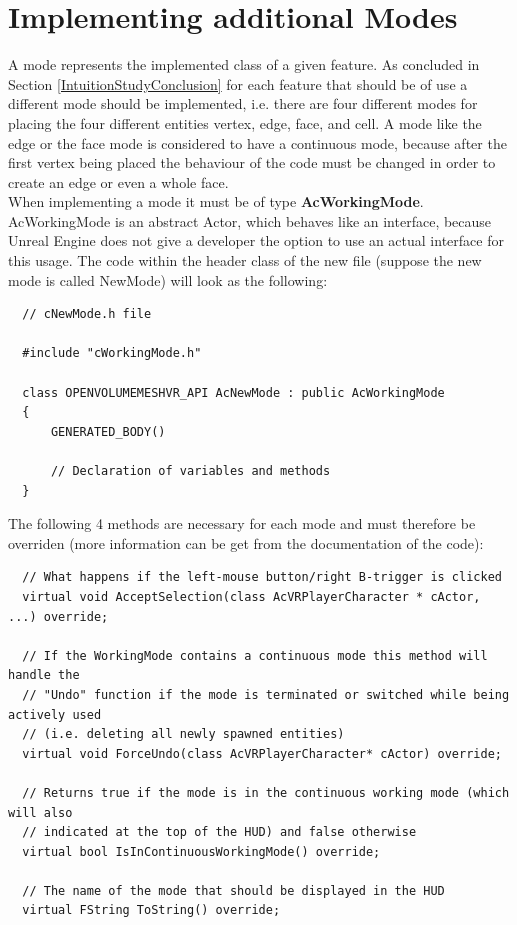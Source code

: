 \documentclass{report}
\begin{document}
	\section{Implementing additional Modes}
	\startsection
		A mode represents the implemented class of a given feature. As concluded in Section \ref{IntuitionStudyConclusion} for each feature that should be of use a different mode should be implemented, i.e. there are four different modes for placing the four different entities vertex, edge, face, and cell. A mode like the edge or the face mode is considered to have a continuous mode, because after the first vertex being placed the behaviour of the code must be changed in order to create an edge or even a whole face. \\
		When implementing a mode it must be of type \textbf{AcWorkingMode}. AcWorkingMode is an abstract Actor, which behaves like an interface, because Unreal Engine does not give a developer the option to use an actual interface for this usage. The code within the header class of the new file (suppose the new mode is called NewMode) will look as the following:
		\begin{verbatim}
  // cNewMode.h file		

  #include "cWorkingMode.h"		
		
  class OPENVOLUMEMESHVR_API AcNewMode : public AcWorkingMode
  {
      GENERATED_BODY()
				
      // Declaration of variables and methods
  }
		\end{verbatim}
		The following 4 methods are necessary for each mode and must therefore be overriden (more information can be get from the documentation of the code):
		\begin{verbatim}
  // What happens if the left-mouse button/right B-trigger is clicked
  virtual void AcceptSelection(class AcVRPlayerCharacter * cActor, ...) override;

  // If the WorkingMode contains a continuous mode this method will handle the
  // "Undo" function if the mode is terminated or switched while being actively used
  // (i.e. deleting all newly spawned entities)
  virtual void ForceUndo(class AcVRPlayerCharacter* cActor) override;

  // Returns true if the mode is in the continuous working mode (which will also
  // indicated at the top of the HUD) and false otherwise
  virtual bool IsInContinuousWorkingMode() override;

  // The name of the mode that should be displayed in the HUD
  virtual FString ToString() override;
		\end{verbatim}
\end{document}
